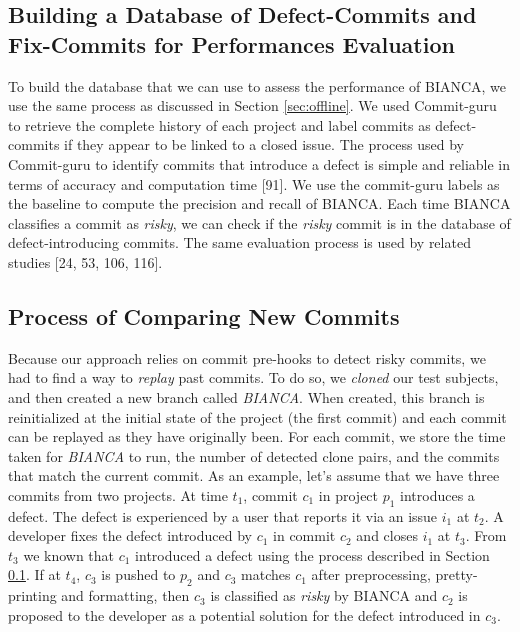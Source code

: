 \documentclass[12pt]{report}
\begin{document}


\subsection{Building a Database of Defect-Commits and Fix-Commits for
Performances Evaluation}\label{sub:golden}

To build the database that we can use to assess the performance of
BIANCA, we use the same process as discussed in Section
\ref{sec:offline}. We used Commit-guru to retrieve the complete history
of each project and label commits as defect-commits if they appear to be
linked to a closed issue. The process used by Commit-guru to identify
commits that introduce a defect is simple and reliable in terms of
accuracy and computation time {[}91{]}. We use the commit-guru labels as
the baseline to compute the precision and recall of BIANCA. Each time
BIANCA classifies a commit as \emph{risky}, we can check if the
\emph{risky} commit is in the database of defect-introducing commits.
The same evaluation process is used by related studies {[}24, 53, 106,
116{]}.

\subsection{Process of Comparing New Commits}\label{sec:newcommits}

Because our approach relies on commit pre-hooks to detect risky commits,
we had to find a way to \emph{replay} past commits. To do so, we
\emph{cloned} our test subjects, and then created a new branch called
\emph{BIANCA}. When created, this branch is reinitialized at the initial
state of the project (the first commit) and each commit can be replayed
as they have originally been. For each commit, we store the time taken
for \emph{BIANCA} to run, the number of detected clone pairs, and the
commits that match the current commit. As an example, let's assume that
we have three commits from two projects. At time \(t_1\), commit \(c_1\)
in project \(p_1\) introduces a defect. The defect is experienced by a
user that reports it via an issue \(i_1\) at \(t_2\). A developer fixes
the defect introduced by \(c_1\) in commit \(c_2\) and closes \(i_1\) at
\(t_3\). From \(t_3\) we known that \(c_1\) introduced a defect using
the process described in Section \ref{sub:golden}. If at \(t_4\),
\(c_3\) is pushed to \(p_2\) and \(c_3\) matches \(c_1\) after
preprocessing, pretty-printing and formatting, then \(c_3\) is
classified as \emph{risky} by BIANCA and \(c_2\) is proposed to the
developer as a potential solution for the defect introduced in \(c_3\).
\end{document}
